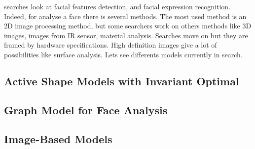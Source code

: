  searches look at facial features detection, and facial expression recognition. Indeed, for analyse a face there is several methods. The most used method is an 2D image processing method, but some searchers work on others methods like 3D images, images from IR sensor, material analysis. Searches move on but they are framed by hardware specifications. High definition images give a lot of possibilities like surface analysis. Lets see differents models currently in search.
\subsection{Active Shape Models with Invariant Optimal}

\subsection{Graph Model for Face Analysis}

\subsection{Image-Based Models}
